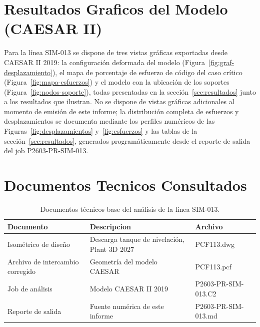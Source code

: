 \appendix
\section{Resultados Graficos del Modelo (CAESAR II)}
\label{appendix:graficos}

Para la l\'{i}nea SIM-013 se dispone de tres vistas gr\'{a}ficas exportadas
desde CAESAR II 2019: la configuraci\'{o}n deformada del modelo
(Figura~\ref{fig:graf-desplazamiento}), el mapa de porcentaje de esfuerzo de
c\'{o}digo del caso cr\'{i}tico (Figura~\ref{fig:mapa-esfuerzos}) y el modelo
con la ubicaci\'{o}n de los soportes (Figura~\ref{fig:nodos-soporte}), todas
presentadas en la secci\'{o}n~\ref{sec:resultados} junto a los resultados que
ilustran. No se dispone de vistas gr\'{a}ficas adicionales al momento de
emisi\'{o}n de este informe; la distribuci\'{o}n completa de esfuerzos y
desplazamientos se documenta mediante los perfiles num\'{e}ricos de las
Figuras~\ref{fig:desplazamientos} y~\ref{fig:esfuerzos} y las tablas de la
secci\'{o}n~\ref{sec:resultados}, generados program\'{a}ticamente desde el
reporte de salida del job P2603-PR-SIM-013.

\section{Documentos Tecnicos Consultados}
\label{appendix:documentos}

\begin{table}[htbp]
    \centering
    \small
    \caption{Documentos t\'{e}cnicos base del an\'{a}lisis de la l\'{i}nea SIM-013.}
    \label{tab:planos}
    \begin{tabular}{@{}lll@{}}
        \toprule
        \textbf{Documento} & \textbf{Descripcion} & \textbf{Archivo} \\
        \midrule
        Isom\'{e}trico de dise\~{n}o & Descarga tanque de nivelaci\'{o}n, Plant 3D 2027 & PCF113.dwg \\
        Archivo de intercambio corregido & Geometr\'{i}a del modelo CAESAR & PCF113.pcf \\
        Job de an\'{a}lisis & Modelo CAESAR II 2019 & P2603-PR-SIM-013.C2 \\
        Reporte de salida & Fuente num\'{e}rica de este informe & P2603-PR-SIM-013.md \\
        \bottomrule
    \end{tabular}
\end{table}
